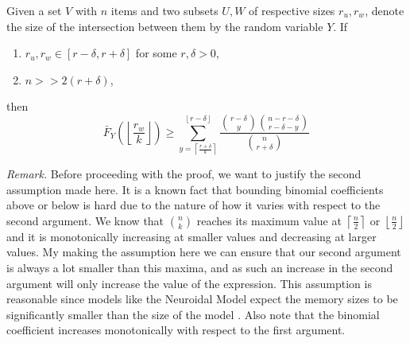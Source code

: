 \begin{lemma}
    \label{lemma:expected-k-int-prob}
    Given a set $V$ with $n$ items and two subsets $U,W$ of respective sizes $r_u,r_w$, denote the size of the intersection between them by the random variable $Y$.
        If \begin{enumerate}
            \item $r_u, r_w \in [r-\delta, r+\delta]$ for some $r, \delta > 0$,
            \item $n >> 2(r+\delta)$, 
        \end{enumerate}      
then $$ \bar{F}_Y\left(\left\lfloor \frac{r_w}{k} 
\right\rfloor\right) \ge \sum_{y = \left\lceil \frac{r+\delta}{k} \right\rceil}^{\left\lfloor r - \delta \right\rfloor} \frac{\binom{r-\delta}{y} \binom{n-r-\delta}{r-\delta-y}}{\binom{n}{r+\delta}}$$
    \end{lemma}
    \textit{Remark.} Before proceeding with the proof, we want to justify the second assumption made here. It is a known fact that bounding binomial coefficients above or below is hard due to the nature of how it varies with respect to the second argument. We know that $n \choose k$ reaches its maximum value at $\left\lceil \frac{n}{2} \right\rceil$ or $\left\lfloor \frac{n}{2} \right\rfloor$ and it is monotonically increasing at smaller values and decreasing at larger values. My making the assumption here we can ensure that our second argument is always a lot smaller than this maxima, and as such an increase in the second argument will only increase the value of the expression. This assumption is reasonable since models like the Neuroidal Model expect the memory sizes to be significantly smaller than the size of the model \cite{valiant2005memorization}. Also note that the binomial coefficient increases monotonically with respect to the first argument. 
